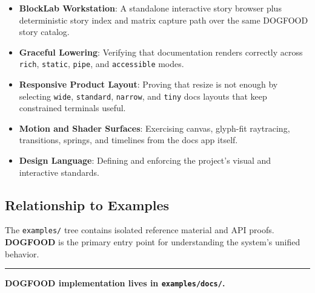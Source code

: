 \begin{itemize}
\item
  \textbf{BlockLab Workstation}: A standalone interactive story browser plus deterministic story index and matrix capture path over the same DOGFOOD story catalog.
\item
  \textbf{Graceful Lowering}: Verifying that documentation renders correctly across \texttt{r\allowbreak{}i\allowbreak{}c\allowbreak{}h}, \texttt{s\allowbreak{}t\allowbreak{}a\allowbreak{}t\allowbreak{}i\allowbreak{}c}, \texttt{p\allowbreak{}i\allowbreak{}p\allowbreak{}e}, and \texttt{a\allowbreak{}c\allowbreak{}c\allowbreak{}e\allowbreak{}s\allowbreak{}s\allowbreak{}i\allowbreak{}b\allowbreak{}l\allowbreak{}e} modes.
\item
  \textbf{Responsive Product Layout}: Proving that resize is not enough by selecting \texttt{w\allowbreak{}i\allowbreak{}d\allowbreak{}e}, \texttt{s\allowbreak{}t\allowbreak{}a\allowbreak{}n\allowbreak{}d\allowbreak{}a\allowbreak{}r\allowbreak{}d}, \texttt{n\allowbreak{}a\allowbreak{}r\allowbreak{}r\allowbreak{}o\allowbreak{}w}, and \texttt{t\allowbreak{}i\allowbreak{}n\allowbreak{}y} docs layouts that keep constrained terminals useful.
\item
  \textbf{Motion and Shader Surfaces}: Exercising canvas, glyph-fit raytracing, transitions, springs, and timelines from the docs app itself.
\item
  \textbf{Design Language}: Defining and enforcing the project's visual and interactive standards.
\end{itemize}

\subsection{Relationship to Examples}\label{record-006-relationship-to-examples}

The \texttt{e\allowbreak{}x\allowbreak{}a\allowbreak{}m\allowbreak{}p\allowbreak{}l\allowbreak{}e\allowbreak{}s\allowbreak{}/} tree contains isolated reference material and API proofs. \textbf{DOGFOOD} is the primary entry point for understanding the system's unified behavior.

\begin{center}\rule{0.5\linewidth}{0.5pt}\end{center}

\textbf{DOGFOOD implementation lives in \texttt{e\allowbreak{}x\allowbreak{}a\allowbreak{}m\allowbreak{}p\allowbreak{}l\allowbreak{}e\allowbreak{}s\allowbreak{}/\allowbreak{}d\allowbreak{}o\allowbreak{}c\allowbreak{}s\allowbreak{}/}.}

